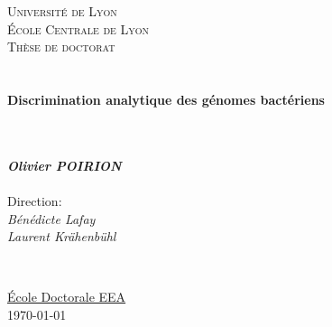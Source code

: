 \documentclass[11pt, a4paper, oneside]{Thesis} %
\renewcommand{\ttitle}{Discrimination analytique des génomes bactériens}
\renewcommand{\univname}{École Centrale de Lyon}
\renewcommand{\degreename}{Docteur en ingénierie du vivant}
\begin{document}
\begin{titlepage}

\begin{center}
\textsc{\LARGE Université de Lyon}\\[0.2cm]
\textsc{\LARGE \univname}\\[1.5cm] %
\textsc{\Large Thèse de doctorat}\\[0.5cm] %

\HRule\\[-0.4cm]\HRule\\[0.4cm] %
{\huge \bfseries \ttitle}\\[0.4cm] %
\HRule\\[-0.4cm]\HRule\\[1.5cm] %
\begin{center}
\begin{minipage}{0.5\textwidth}
\large
\emph{\textbf{\Large Olivier POIRION}}\\\\
\textnormal{Direction:}\\
\emph{\textnormal{Bénédicte Lafay}} \\
\emph{\textnormal{Laurent Krähenbühl}}\\
\end{minipage}\\[3cm]
\end{center}
\deptname
\href{http://edeea.ec-lyon.fr/}{École Doctorale EEA}\\[2cm] %
 
{\large \today}\\[4cm] %
\end{center}

\end{titlepage}
\clearpage
\clearpage

\end{document}
